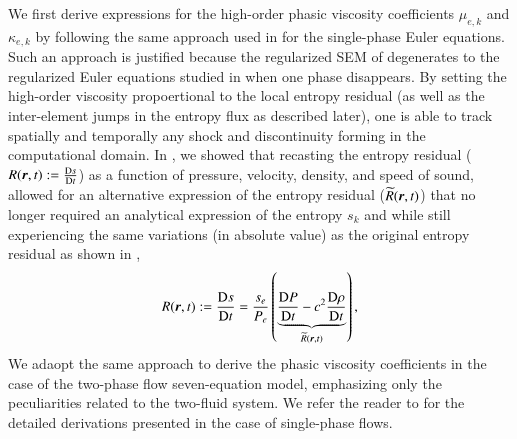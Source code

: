 \documentclass[preprint,10pt]{elsarticle}
\begin{document}
We first derive expressions for the high-order phasic viscosity coefficients $\mu_{e,k}$ and $\kappa_{e,k}$ by following the same 
approach used in \cite{DelchiniCompFluid2014-euler} for the single-phase Euler equations. Such an approach is justified because the regularized SEM of  
degenerates to the regularized Euler equations studied in \cite{DelchiniCompFluid2014-euler} when one phase disappears.
By setting the high-order viscosity propoertional to the local entropy residual (as well as the inter-element jumps in the entropy flux as described later),
one is able to track spatially and temporally any shock and discontinuity forming in the computational domain. 
In \cite{DelchiniCompFluid2014-euler}, we showed that recasting the entropy residual ($R(\boldsymbol r,t)  := \frac{\textrm{D} s}{\textrm{D} t}$) 
as a function of pressure, velocity, density, and speed of 
sound, allowed for an alternative expression of the entropy residual ($\widetilde{R}(\boldsymbol r,t)$)
that no longer required an analytical expression of the entropy $s_k$ and while still experiencing the same variations (in absolute value) 
as the original entropy residual as shown in ,
%
\begin{equation}\label{eq:ent-res-sem}
R(\boldsymbol r,t)  := \frac{\textrm{D} s}{\textrm{D} t} = \frac{s_e}{P_e} \left( \underbrace{\frac{\textrm{D} P}{\textrm{D} t} - c^2 \frac{\textrm{D} \rho}{\textrm{D} t} }_{\widetilde{R}(\boldsymbol r,t)} \right) ,
\end{equation} 
%
We adaopt the same approach to derive the phasic viscosity coefficients in the case of the two-phase flow seven-equation model, emphasizing only the 
peculiarities related to the two-fluid system. We refer the reader to \cite{DelchiniCompFluid2014-euler} for the detailed derivations presented in the case of
single-phase flows.
\end{document}
